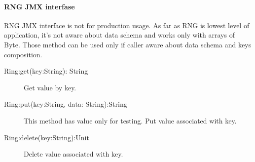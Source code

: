 \paragraph{RNG JMX interfase}
RNG JMX interface is not for production usage. As far as RNG is lowest level of application, it's not aware about data schema and works
only with arrays of Byte. Those method can be used only if caller aware about data schema and keys composition.

\begin{description}
\item
[Ring:get(key:String): String]
Get value by key.
\item
  [Ring:put(key:String, data: String):String]
  This method has value only for testing. Put value associated with key.
\item
[Ring:delete(key:String):Unit]
Delete value associated with key.
\end{description}

